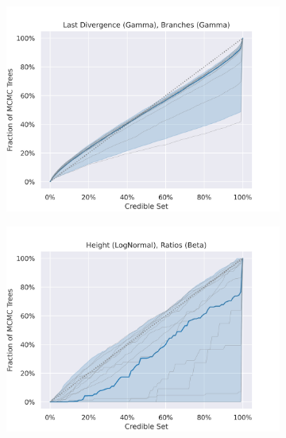 \documentclass[10pt,letterpaper]{article}
\begin{document}
\begin{figure}[h!]
	\begin{subfigure}[b]{0.45\textwidth}
		\centering
		\includegraphics[width=\textwidth]{figures/yule-200-ccd1-credible-sets-Last Divergence (Gamma), Branches (Gamma).png}
	\end{subfigure}
	\begin{subfigure}[b]{0.45\textwidth}
		\centering
		\includegraphics[width=\textwidth]{figures/bio-ccd1-credible-sets-Height (LogNormal), Ratios (Beta).png}
	\end{subfigure}


\end{figure}
\end{document}
